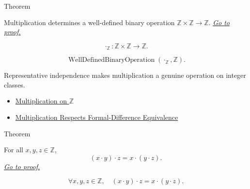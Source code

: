\begin{theorembox}{Theorem}
\begin{theorem}
\label{thm:multiplication-on-z-well-defined}
Multiplication determines a well-defined binary operation
$\mathbb{Z}\times\mathbb{Z}\to\mathbb{Z}$.
\hyperref[prf:multiplication-on-z-well-defined]{\textit{Go to proof.}}
\end{theorem}
\end{theorembox}

\begin{remark*}
\[
\cdot_{\mathbb{Z}}:\mathbb{Z}\times\mathbb{Z}\to\mathbb{Z}.
\]
\end{remark*}

\begin{remark*}
\[
\operatorname{WellDefinedBinaryOperation}(\cdot_{\mathbb{Z}},\mathbb{Z}).
\]
\end{remark*}

\begin{remark*}[Interpretation]
Representative independence makes multiplication a genuine operation on
integer classes.
\end{remark*}

\begin{dependencies}
\begin{itemize}
  \item \hyperref[def:multiplication-on-z-classes]{Multiplication on $\mathbb{Z}$}
  \item \hyperref[lem:multiplication-on-z-classes-respects-equivalence]{Multiplication Respects Formal-Difference Equivalence}
\end{itemize}
\end{dependencies}

\begin{theorembox}{Theorem}
\begin{theorem}
\label{thm:multiplication-on-z-associative}
For all $x,y,z\in\mathbb{Z}$,
\[
(x\cdot y)\cdot z=x\cdot(y\cdot z).
\]
\hyperref[prf:multiplication-on-z-associative]{\textit{Go to proof.}}
\end{theorem}
\end{theorembox}

\begin{remark*}
\[
\forall x,y,z\in\mathbb{Z},\quad
(x\cdot y)\cdot z=x\cdot(y\cdot z).
\]
\end{remark*}

